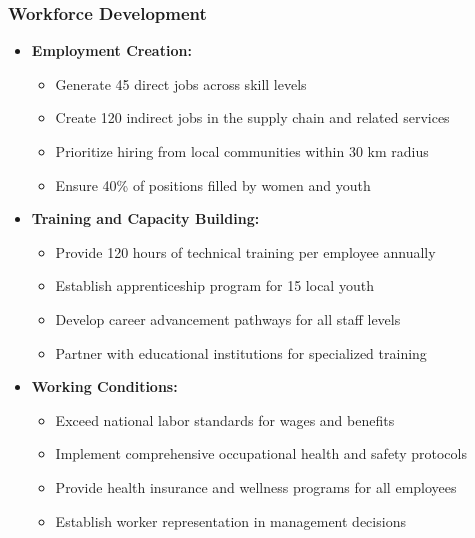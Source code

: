 \subsubsection{Workforce Development}
\begin{itemize}
    \item \textbf{Employment Creation:}
    \begin{itemize}
        \item Generate 45 direct jobs across skill levels
        \item Create 120 indirect jobs in the supply chain and related services
        \item Prioritize hiring from local communities within 30 km radius
        \item Ensure 40\% of positions filled by women and youth
    \end{itemize}
    
    \item \textbf{Training and Capacity Building:}
    \begin{itemize}
        \item Provide 120 hours of technical training per employee annually
        \item Establish apprenticeship program for 15 local youth
        \item Develop career advancement pathways for all staff levels
        \item Partner with educational institutions for specialized training
    \end{itemize}
    
    \item \textbf{Working Conditions:}
    \begin{itemize}
        \item Exceed national labor standards for wages and benefits
        \item Implement comprehensive occupational health and safety protocols
        \item Provide health insurance and wellness programs for all employees
        \item Establish worker representation in management decisions
    \end{itemize}
\end{itemize}

